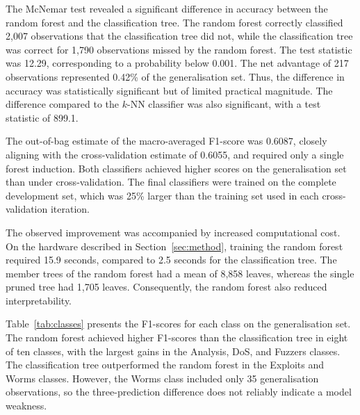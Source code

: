\documentclass[conference]{IEEEtran}
\begin{document}
The McNemar test revealed a significant difference in accuracy between the random forest and the classification tree. The random forest correctly classified 2,007 observations that the classification tree did not, while the classification tree was correct for 1,790 observations missed by the random forest. The test statistic was 12.29, corresponding to a probability below 0.001. The net advantage of 217 observations represented 0.42\% of the generalisation set. Thus, the difference in accuracy was statistically significant but of limited practical magnitude. The difference compared to the $k$-NN classifier was also significant, with a test statistic of 899.1.

The out-of-bag estimate of the macro-averaged F1-score was 0.6087, closely aligning with the cross-validation estimate of 0.6055, and required only a single forest induction. Both classifiers achieved higher scores on the generalisation set than under cross-validation. The final classifiers were trained on the complete development set, which was 25\% larger than the training set used in each cross-validation iteration.

The observed improvement was accompanied by increased computational cost. On the hardware described in Section~\ref{sec:method}, training the random forest required 15.9 seconds, compared to 2.5 seconds for the classification tree. The member trees of the random forest had a mean of 8,858 leaves, whereas the single pruned tree had 1,705 leaves. Consequently, the random forest also reduced interpretability.

Table~\ref{tab:classes} presents the F1-scores for each class on the generalisation set. The random forest achieved higher F1-scores than the classification tree in eight of ten classes, with the largest gains in the Analysis, DoS, and Fuzzers classes. The classification tree outperformed the random forest in the Exploits and Worms classes. However, the Worms class included only 35 generalisation observations, so the three-prediction difference does not reliably indicate a model weakness.
\end{document}
